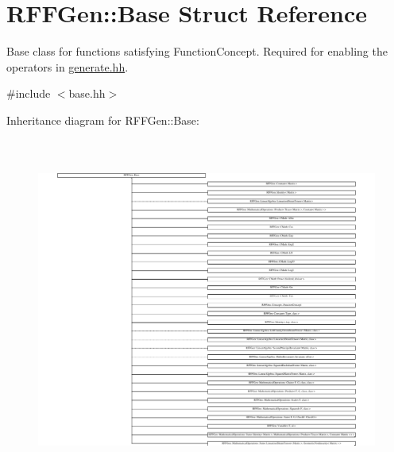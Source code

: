 \hypertarget{structRFFGen_1_1Base}{\section{R\-F\-F\-Gen\-:\-:Base Struct Reference}
\label{structRFFGen_1_1Base}
}


Base class for functions satisfying Function\-Concept. Required for enabling the operators in \hyperlink{generate_8hh_source}{generate.\-hh}.  




{\ttfamily \#include $<$base.\-hh$>$}

Inheritance diagram for R\-F\-F\-Gen\-:\-:Base\-:\begin{figure}[H]
\begin{center}
\leavevmode
\includegraphics[height=11.341772cm]{structRFFGen_1_1Base}
\end{center}
\end{figure}
